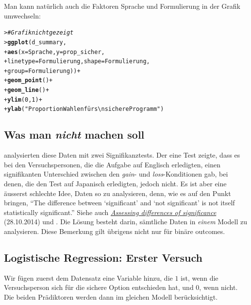 \documentclass[oneside, 10pt]{book}\usepackage[]{graphicx}\usepackage[]{xcolor}
\makeatletter
\newcommand{\hlnum}[1]{\textcolor[rgb]{0.686,0.059,0.569}{#1}}%
\newcommand{\hlstr}[1]{\textcolor[rgb]{0.192,0.494,0.8}{#1}}%
\newcommand{\hlcom}[1]{\textcolor[rgb]{0.678,0.584,0.686}{\textit{#1}}}%
\newcommand{\hlopt}[1]{\textcolor[rgb]{0,0,0}{#1}}%
\newcommand{\hlstd}[1]{\textcolor[rgb]{0.345,0.345,0.345}{#1}}%
\newcommand{\hlkwc}[1]{\textcolor[rgb]{0.333,0.667,0.333}{#1}}%
\newcommand{\hlkwd}[1]{\textcolor[rgb]{0.737,0.353,0.396}{\textbf{#1}}}%
\newenvironment{kframe}{%
 \def\at@end@of@kframe{}%
 \ifinner\ifhmode%
  \def\at@end@of@kframe{\end{minipage}}%
  \begin{minipage}{\columnwidth}%
 \fi\fi%
 \def\FrameCommand##1{\hskip\@totalleftmargin \hskip-\fboxsep
 \colorbox{shadecolor}{##1}\hskip-\fboxsep
     \hskip-\linewidth \hskip-\@totalleftmargin \hskip\columnwidth}%
 \MakeFramed {\advance\hsize-\width
   \@totalleftmargin\z@ \linewidth\hsize
   \@setminipage}}%
 {\par\unskip\endMakeFramed%
 \at@end@of@kframe}
\newenvironment{knitrout}{}{} %
\makeatother
\begin{document}
Man kann natürlich auch die Faktoren Sprache und Formulierung
in der Grafik umwechseln:
\begin{knitrout}
\color{fgcolor}\begin{kframe}
\begin{alltt}
\hlstd{> }\hlcom{# Grafik nicht gezeigt}
\hlstd{> }\hlkwd{ggplot}\hlstd{(d_summary,}
\hlstd{+ }       \hlkwd{aes}\hlstd{(}\hlkwc{x} \hlstd{= Sprache,} \hlkwc{y} \hlstd{= prop_sicher,}
\hlstd{+ }           \hlkwc{linetype} \hlstd{= Formulierung,} \hlkwc{shape} \hlstd{= Formulierung,}
\hlstd{+ }           \hlkwc{group} \hlstd{= Formulierung))} \hlopt{+}
\hlstd{+ }  \hlkwd{geom_point}\hlstd{()} \hlopt{+}
\hlstd{+ }  \hlkwd{geom_line}\hlstd{()} \hlopt{+}
\hlstd{+ }  \hlkwd{ylim}\hlstd{(}\hlnum{0}\hlstd{,} \hlnum{1}\hlstd{)} \hlopt{+}
\hlstd{+ }  \hlkwd{ylab}\hlstd{(}\hlstr{"Proportion Wahlen fürs\textbackslash{}nsichere Programm"}\hlstd{)}
\end{alltt}
\end{kframe}
\end{knitrout}

\subsection{Was man \emph{nicht} machen soll}
\citet{Keysar2012} analysierten diese Daten mit
zwei Signifikanztests. Der eine Test zeigte, dass
es bei den Versuchspersonen, die die Aufgabe auf Englisch
erledigten, einen signifikanten Unterschied
zwischen den \textit{gain}- und \textit{loss}-Konditionen gab,
bei denen, die den Test auf Japanisch erledigten, jedoch nicht.
Es ist aber eine äusserst schlechte Idee, Daten so zu analysieren,
denn, wie \citet{Gelman2006} es auf den Punkt bringen,
``The difference between `significant'
and `not significant' is not itself
statistically significant.''
Siehe auch \href{https://janhove.github.io/analysis/2014/10/28/assessing-differences-of-significance}{\textit{Assessing differences of significance}} (28.10.2014) und \citet{Nieuwenhuis2011}.
Die Lösung besteht darin, sämtliche Daten in \emph{einem}
Modell zu analysieren.
Diese Bemerkung gilt übrigens nicht nur für binäre outcomes.

\subsection{Logistische Regression: Erster Versuch}
Wir fügen zuerst dem Datensatz eine Variable hinzu,
die $1$ ist, wenn die Versuchsperson sich für die sichere Option
entschieden hat, und $0$, wenn nicht. Die beiden Prädiktoren
werden dann im gleichen Modell berücksichtigt.
\end{document}
